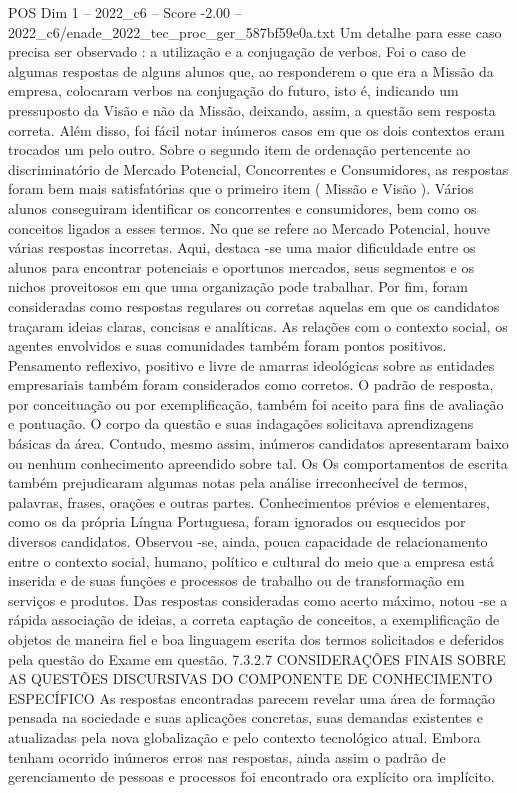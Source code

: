 \begin{textsample}{POS Dim 1 – 2022\_c6 – Score -2.00 – 2022\_c6/enade\_2022\_tec\_proc\_ger\_587bf59e0a.txt}
Um detalhe para esse caso precisa ser observado : a utilização e a conjugação de verbos.
Foi o caso de algumas respostas de alguns alunos que, ao responderem o que era a Missão da empresa, colocaram verbos na conjugação do futuro, isto é, indicando um pressuposto da Visão e não da Missão, deixando, assim, a questão sem resposta correta.
Além disso, foi fácil notar inúmeros casos em que os dois contextos eram trocados um pelo outro.
Sobre o segundo item de ordenação pertencente ao discriminatório de Mercado Potencial, Concorrentes e Consumidores, as respostas foram bem mais satisfatórias que o primeiro item ( Missão e Visão ).
Vários alunos conseguiram identificar os concorrentes e consumidores, bem como os conceitos ligados a esses termos.
No que se refere ao Mercado Potencial, houve várias respostas incorretas.
Aqui, destaca -se uma maior dificuldade entre os alunos para encontrar potenciais e oportunos mercados, seus segmentos e os nichos proveitosos em que uma organização pode trabalhar.
Por fim, foram consideradas como respostas regulares ou corretas aquelas em que os candidatos traçaram ideias claras, concisas e analíticas.
As relações com o contexto social, os agentes envolvidos e suas comunidades também foram pontos positivos.
Pensamento reflexivo, positivo e livre de amarras ideológicas sobre as entidades empresariais também foram considerados como corretos.
O padrão de resposta, por conceituação ou por exemplificação, também foi aceito para fins de avaliação e pontuação.
O corpo da questão e suas indagações solicitava aprendizagens básicas da área.
Contudo, mesmo assim, inúmeros candidatos apresentaram baixo ou nenhum conhecimento apreendido sobre tal.
Os Os comportamentos de escrita também prejudicaram algumas notas pela análise irreconhecível de termos, palavras, frases, orações e outras partes.
Conhecimentos prévios e elementares, como os da própria Língua Portuguesa, foram ignorados ou esquecidos por diversos candidatos.
Observou -se, ainda, pouca capacidade de relacionamento entre o contexto social, humano, político e cultural do meio que a empresa está inserida e de suas funções e processos de trabalho ou de transformação em serviços e produtos.
Das respostas consideradas como acerto máximo, notou -se a rápida associação de ideias, a correta captação de conceitos, a exemplificação de objetos de maneira fiel e boa linguagem escrita dos termos solicitados e deferidos pela questão do Exame em questão. 7.3.2.7 CONSIDERAÇÕES FINAIS SOBRE AS QUESTÕES DISCURSIVAS DO COMPONENTE DE CONHECIMENTO ESPECÍFICO As respostas encontradas parecem revelar uma área de formação pensada na sociedade e suas aplicações concretas, suas demandas existentes e atualizadas pela nova globalização e pelo contexto tecnológico atual.
Embora tenham ocorrido inúmeros erros nas respostas, ainda assim o padrão de gerenciamento de pessoas e processos foi encontrado ora explícito ora implícito.

\end{textsample}
